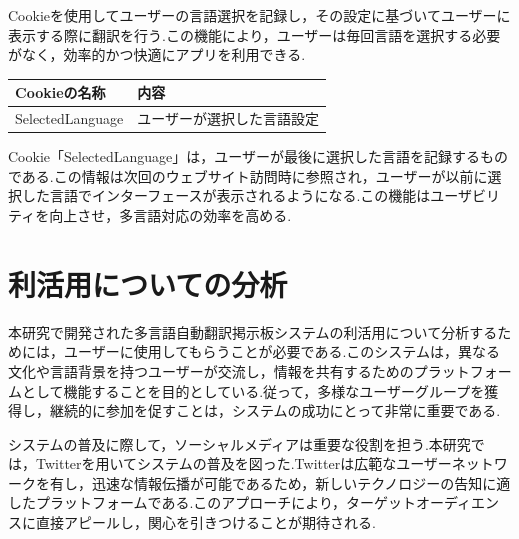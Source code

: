 \documentclass[b5paper,12pt,dvipdfmx]{jsreport}
\begin{document}
Cookieを使用してユーザーの言語選択を記録し，その設定に基づいてユーザーに表示する際に翻訳を行う.この機能により，ユーザーは毎回言語を選択する必要がなく，効率的かつ快適にアプリを利用できる.

\begin{adjustbox}{width=\textwidth,center}
    \begin{tabular}{ll}
    \toprule
    \textbf{Cookieの名称} & \textbf{内容} \\
    \midrule
    SelectedLanguage & ユーザーが選択した言語設定 \\
    \bottomrule
    \end{tabular}
\end{adjustbox}

Cookie「SelectedLanguage」は，ユーザーが最後に選択した言語を記録するものである.この情報は次回のウェブサイト訪問時に参照され，ユーザーが以前に選択した言語でインターフェースが表示されるようになる.この機能はユーザビリティを向上させ，多言語対応の効率を高める.


\chapter{利活用についての分析}

本研究で開発された多言語自動翻訳掲示板システムの利活用について分析するためには，ユーザーに使用してもらうことが必要である.このシステムは，異なる文化や言語背景を持つユーザーが交流し，情報を共有するためのプラットフォームとして機能することを目的としている.従って，多様なユーザーグループを獲得し，継続的に参加を促すことは，システムの成功にとって非常に重要である.

システムの普及に際して，ソーシャルメディアは重要な役割を担う.本研究では，Twitterを用いてシステムの普及を図った.Twitterは広範なユーザーネットワークを有し，迅速な情報伝播が可能であるため，新しいテクノロジーの告知に適したプラットフォームである.このアプローチにより，ターゲットオーディエンスに直接アピールし，関心を引きつけることが期待される.
\end{document}
